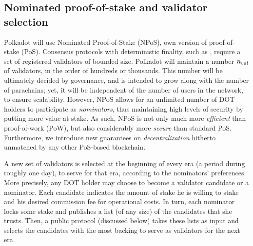 \subsection{Nominated proof-of-stake and validator selection}\label{sec:validators}
Polkadot will use Nominated Proof-of-Stake (NPoS),  own version of proof-of-stake (PoS).
Consensus protocols with deterministic finality, such as , require a set of registered validators of bounded size.
Polkadot will maintain a number $n_{val}$ of validators, in the order of hundreds or thousands.
This number will be ultimately decided by governance, and is intended to grow along with the number of parachains;
yet, it will be independent of the number of users in the network, to ensure scalability.
However, NPoS allows for an unlimited number of DOT holders to participate as \emph{nominators},
thus maintaining high levels of security by putting more value at stake.
As such, NPoS is not only much more \emph{efficient} than proof-of-work (PoW),
but also considerably more \emph{secure} than standard PoS.
Furthermore, we introduce new guarantees on \emph{decentralization} hitherto unmatched by any other PoS-based blockchain.

A new set of validators is selected at the beginning of every era (a period during roughly one day),
to serve for that era, according to the nominators' preferences.
More precisely, any DOT holder may choose to become a validator candidate or a nominator.
Each candidate indicates the amount of stake he is willing to stake and his desired commission fee for operational costs.
In turn, each nominator locks some stake and publishes a list (of any size) of the candidates that she trusts.
Then, a public protocol (discussed below) takes these lists as input and selects the candidates
with the most backing to serve as validators for the next era.

